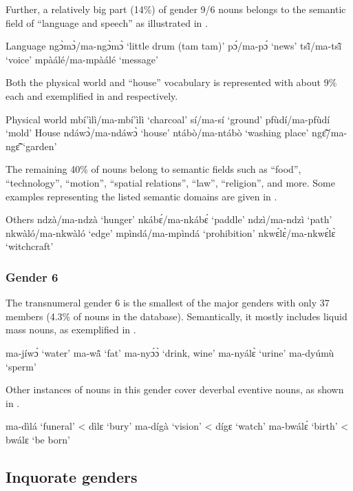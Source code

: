 \noindent Further, a relatively big part (14\%) of gender 9/6 nouns belongs to the semantic field of ``language and speech'' as illustrated in .

\ea\label{9/6lang} Language
\ea ngɔ̀mɔ̀/ma-ngɔ̀mɔ̀ `little drum (tam tam)'
\ex pɔ́/ma-pɔ́ `news'
\ex tsĩ̂/ma-tsĩ̂ `voice'
\ex mpàálé/ma-mpàálé `message'
\z
\z

\noindent Both the physical world and ``house'' vocabulary is represented with about 9\% each and exemplified in  and  respectively.

\ea\label{9/6world} Physical world
\ea mbí'ìlì/ma-mbí'ìlì `charcoal'
\ex sí/ma-sí `ground'
\ex pfùdí/ma-pfùdí `mold'
\z
\ex\label{9/6house} House
\ea ndáwɔ̀/ma-ndáwɔ̀ `house'
\ex ntábò/ma-ntábò `washing place'
\ex ngɛ̃̂/ma-ngɛ̃̂ `garden'
\z
\z

\largerpage
\noindent The remaining 40\% of nouns belong to semantic fields such as ``food'', ``technology'', ``motion'', ``spatial relations'', ``law'', ``religion'', and more. Some examples representing the listed semantic domains are given in .

\ea\label{9/6other} Others
\ea ndzà/ma-ndzà `hunger'
\ex nkábɛ́/ma-nkábɛ́ `paddle'
\ex ndzì/ma-ndzì `path'
\ex nkwàló/ma-nkwàló `edge'
\ex mpìndá/ma-mpìndá `prohibition'
\ex nkwɛ́lɛ̀/ma-nkwɛ́lɛ̀ `witchcraft'
\z
\z

\subsubsection{Gender 6} 
\label{sec:6}

The transnumeral gender 6 is the smallest of the major genders with only 37 members (4.3\% of nouns in the database). Semantically, it mostly includes liquid mass nouns, as exemplified in .

\ea\label{0/6a}
\ea ma-jíwɔ́ `water'
\ex ma-wã̂ `fat'
\ex ma-nyɔ́ɔ̀ `drink, wine'
\ex ma-nyálɛ̀ `urine'
\ex ma-dyúmù `sperm'
\z
\z

\noindent Other instances of nouns in this gender cover deverbal eventive nouns, as shown in .

\ea\label{0/6b}
\ea ma-dìlá `funeral' <  dìlɛ `bury'
\ex ma-dígà `vision' <  dígɛ `watch'
\ex ma-bwálɛ́ `birth' <  bwálɛ `be born'
\z
\z


\subsection{Inquorate genders}
\label{sec:MinGen}

